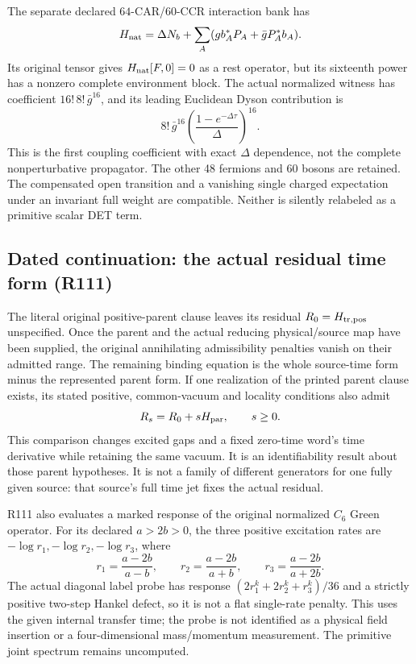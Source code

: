 The separate declared $64$-CAR/$60$-CCR interaction bank has
\[
 H_{\rm nat}=\Delta N_b+
       \sum_A(gb_A^*P_A+\bar gP_A^*b_A).
\]
Its original tensor gives $H_{\rm nat}[F,0]=0$ as a rest operator,
but its sixteenth power has a nonzero complete environment block.
The actual normalized witness has coefficient $16!\,8!\,\bar g^{16}$,
and its leading Euclidean Dyson contribution is
\[
 8!\,\bar g^{16}
 \left(\frac{1-e^{-\Delta\tau}}{\Delta}\right)^{16}.
\]
This is the first coupling coefficient with exact $\Delta$ dependence,
not the complete nonperturbative propagator. The other 48 fermions and
60 bosons are retained. The compensated open transition and a
vanishing single charged expectation under an invariant full weight
are compatible. Neither is silently relabeled as a primitive scalar
DET term.

\subsection*{Dated continuation: the actual residual time form (R111)}

The literal original positive-parent clause leaves its residual
$R_0=H_{\rm tr,pos}$ unspecified. Once the parent and the actual reducing
physical/source map have been supplied, the original annihilating
admissibility penalties vanish on their admitted range. The remaining
binding equation is the whole source-time form minus the represented
parent form. If one realization of the printed parent clause exists,
its stated positive, common-vacuum and locality conditions also admit
\[
        R_s=R_0+sH_{\rm par},\qquad s\geq0.
\]
This comparison changes excited gaps and a fixed zero-time word's
time derivative while retaining the same vacuum. It is an
identifiability result about those parent hypotheses. It is not a
family of different generators for one fully given source: that
source's full time jet fixes the actual residual.

R111 also evaluates a marked response of the original normalized
$C_6$ Green operator. For its declared $a>2b>0$, the three positive
excitation rates are $-\log r_1,-\log r_2,-\log r_3$, where
\[
 r_1=\frac{a-2b}{a-b},\qquad
 r_2=\frac{a-2b}{a+b},\qquad
 r_3=\frac{a-2b}{a+2b}.
\]
The actual diagonal label probe has response
$(2r_1^k+2r_2^k+r_3^k)/36$ and a strictly positive two-step
Hankel defect, so it is not a flat single-rate penalty. This uses the
given internal transfer time; the probe is not identified as a
physical field insertion or a four-dimensional mass/momentum
measurement. The primitive joint spectrum remains uncomputed.

